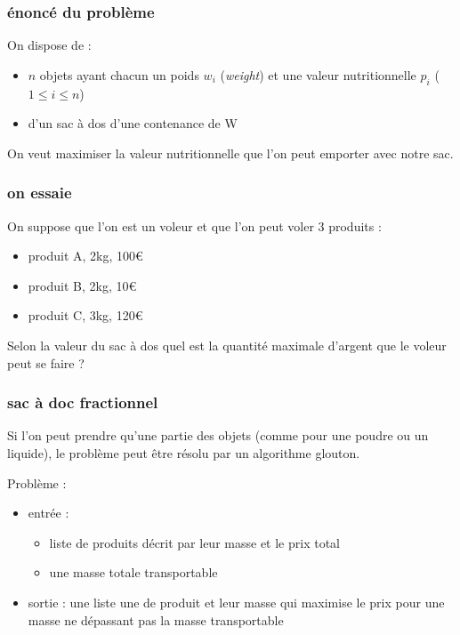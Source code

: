 \documentclass[
]{article}
\providecommand{\tightlist}{%
  \setlength{\itemsep}{0pt}\setlength{\parskip}{0pt}}
\begin{document}
\hypertarget{uxe9noncuxe9-du-probluxe8me}{%
\subsubsection{énoncé du problème}\label{uxe9noncuxe9-du-probluxe8me}}

On dispose de :

\begin{itemize}
\tightlist
\item
  \(n\) objets ayant chacun un poids \(w_i\) (\emph{weight}) et une
  valeur nutritionnelle \(p_i\) (\(1 \leq i \leq n\))
\item
  d'un sac à dos d'une contenance de W
\end{itemize}

On veut maximiser la valeur nutritionnelle que l'on peut emporter avec
notre sac.

\hypertarget{on-essaie}{%
\subsubsection{on essaie}\label{on-essaie}}

On suppose que l'on est un voleur et que l'on peut voler 3 produits :

\begin{itemize}
\tightlist
\item
  produit A, 2kg, 100€
\item
  produit B, 2kg, 10€
\item
  produit C, 3kg, 120€
\end{itemize}

Selon la valeur du sac à dos quel est la quantité maximale d'argent que
le voleur peut se faire ?

\hypertarget{sac-uxe0-doc-fractionnel}{%
\subsubsection{sac à doc fractionnel}\label{sac-uxe0-doc-fractionnel}}

Si l'on peut prendre qu'une partie des objets (comme pour une poudre ou
un liquide), le problème peut être résolu par un algorithme glouton.

Problème :

\begin{itemize}
\tightlist
\item
  entrée :

  \begin{itemize}
  \tightlist
  \item
    liste de produits décrit par leur masse et le prix total
  \item
    une masse totale transportable
  \end{itemize}
\item
  sortie : une liste une de produit et leur masse qui maximise le prix
  pour une masse ne dépassant pas la masse transportable
\end{itemize}
\end{document}
